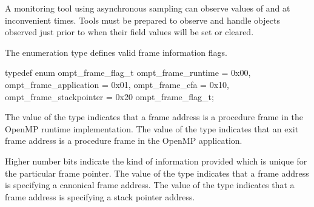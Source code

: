 %
%
%
%

\begin{note}
A monitoring tool using asynchronous sampling can observe values
of  and  at inconvenient times.
Tools must be prepared to observe and handle 
objects observed just prior to when their field values will be set or
cleared.
\end{note}


\summary
The  enumeration type defines valid frame information
flags.

\syntax
\begin{ccppspecific}
\begin{ompSyntax}
typedef enum ompt_frame_flag_t {
  ompt_frame_runtime        = 0x00,
  ompt_frame_application    = 0x01,
  ompt_frame_cfa            = 0x10,
  ompt_frame_stackpointer   = 0x20
} ompt_frame_flag_t; 
\end{ompSyntax}
\end{ccppspecific}

\descr
The value  of the  type
indicates that a frame address is a procedure frame in the OpenMP
runtime implementation.
The value  of the  type
indicates that an exit frame address is a procedure frame in the OpenMP
application.

Higher number bits indicate the kind of information provided which is unique
for the particular frame pointer.
The value  of the  type
indicates that a frame address is specifying a canonical frame address.
The value  of the  type
indicates that a frame address is specifying a stack pointer address.
